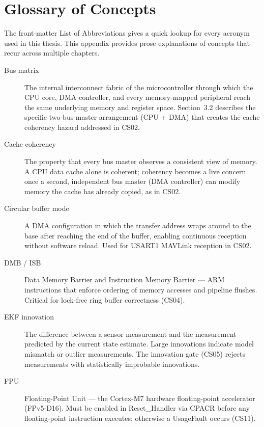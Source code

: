 \chapter{Glossary of Concepts}
\label{app:F}

The front-matter List of Abbreviations gives a quick lookup for every acronym used in this thesis. This appendix provides prose explanations of concepts that recur across multiple chapters.

\begin{description}
\item[Bus matrix] The internal interconnect fabric of the microcontroller through which the CPU core, DMA controller, and every memory-mapped peripheral reach the same underlying memory and register space. Section~3.2 describes the specific two-bus-master arrangement (CPU + DMA) that creates the cache coherency hazard addressed in CS02.

\item[Cache coherency] The property that every bus master observes a consistent view of memory. A CPU data cache alone is coherent; coherency becomes a live concern once a second, independent bus master (DMA controller) can modify memory the cache has already copied, as in CS02.

\item[Circular buffer mode] A DMA configuration in which the transfer address wraps around to the base after reaching the end of the buffer, enabling continuous reception without software reload. Used for USART1 MAVLink reception in CS02.

\item[DMB / ISB] Data Memory Barrier and Instruction Memory Barrier --- ARM instructions that enforce ordering of memory accesses and pipeline flushes. Critical for lock-free ring buffer correctness (CS04).

\item[EKF innovation] The difference between a sensor measurement and the measurement predicted by the current state estimate. Large innovations indicate model mismatch or outlier measurements. The innovation gate (CS05) rejects measurements with statistically improbable innovations.

\item[FPU] Floating-Point Unit --- the Cortex-M7 hardware floating-point accelerator (FPv5-D16). Must be enabled in Reset\_Handler via CPACR before any floating-point instruction executes; otherwise a UsageFault occurs (CS11).


\end{description}
